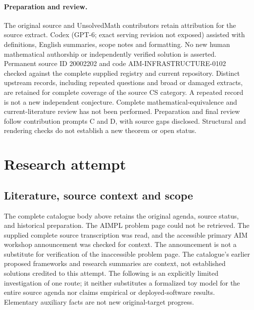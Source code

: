 \documentclass[11pt]{article}
\begin{document}
\paragraph{Preparation and review.}
The original source and UnsolvedMath contributors retain attribution for the source extract. Codex (GPT-6; exact serving revision not exposed) assisted with definitions, English summaries, scope notes and formatting. No new human mathematical authorship or independently verified solution is asserted. Permanent source ID 20002202 and code AIM-INFRASTRUCTURE-0102 checked against the complete supplied registry and current repository. Distinct upstream records, including repeated questions and broad or damaged extracts, are retained for complete coverage of the source CS category. A repeated record is not a new independent conjecture. Complete mathematical-equivalence and current-literature review has not been performed. Preparation and final review follow contribution prompts C and D, with source gaps disclosed. Structural and rendering checks do not establish a new theorem or open status.
\label{end:20002202}

\section{Research attempt}
\subsection{Literature, source context and scope}
The complete catalogue body above retains the original agenda, source status, and historical preparation. The AIMPL problem page could not be retrieved. The supplied complete source transcription was read, and the accessible primary AIM workshop announcement was checked for context. The announcement is not a substitute for verification of the inaccessible problem page. The catalogue's earlier proposed frameworks and research summaries are context, not established solutions credited to this attempt. The following is an explicitly limited investigation of one route; it neither substitutes a formalized toy model for the entire source agenda nor claims empirical or deployed-software results. Elementary auxiliary facts are not new original-target progress.
\end{document}
